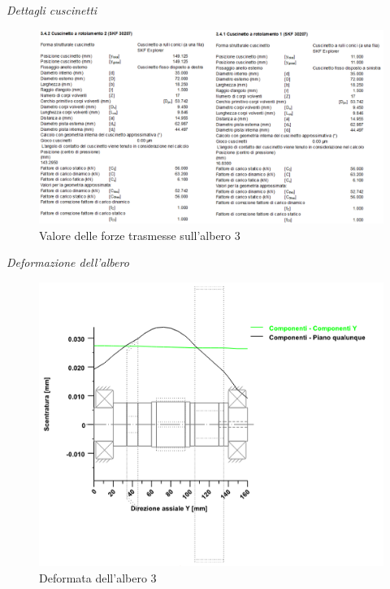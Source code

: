 \emph{Dettagli cuscinetti}
\begin{figure}[h]
    \centering
    \includegraphics[scale=0.5]{Immagini/Forze1CuscinettiAlbero3.png}
    \caption{Valore delle forze trasmesse sull'albero 3}
    \label{fig:Forze1CusinettiAlbero3}
\end{figure}
\newpage
\emph{Deformazione dell'albero}
\begin{figure}[h]
    \centering
    \includegraphics[scale=0.5]{Immagini/Deformata1Albero3.png}
    \caption{Deformata dell'albero 3}
    \label{fig:Deformata1Albero3}
\end{figure}

